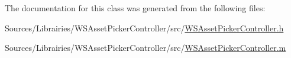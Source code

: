The documentation for this class was generated from the following files\-:\begin{DoxyCompactItemize}
\item 
Sources/\-Librairies/\-W\-S\-Asset\-Picker\-Controller/src/\hyperlink{_w_s_asset_picker_controller_8h}{W\-S\-Asset\-Picker\-Controller.\-h}\item 
Sources/\-Librairies/\-W\-S\-Asset\-Picker\-Controller/src/\hyperlink{_w_s_asset_picker_controller_8m}{W\-S\-Asset\-Picker\-Controller.\-m}\end{DoxyCompactItemize}

